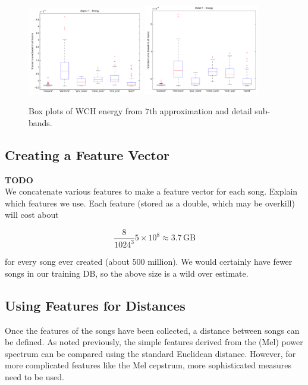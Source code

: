 \documentclass[12pt]{article}
\begin{document}
\begin{figure}[h!]
   \centering
   \includegraphics[width=0.45\textwidth]{figures/wch_box_08.pdf}
   \includegraphics[width=0.45\textwidth]{figures/wch_box_16.pdf}
   \caption{Box plots of WCH energy from $7$th approximation and detail sub-bands.}
   \label{fig:wch_box}
\end{figure}

\subsection{Creating a Feature Vector}
\textbf{TODO}\\
We concatenate various features to make a feature vector for each song.  Explain which features we use.  Each feature (stored as a double, which may be overkill) will cost about 

\[ \dfrac{8}{1024^3}5\times10^8 \approx 3.7\,\text{GB} \] 

\noindent for every song ever created (about $500$ million).  We would certainly have fewer songs in our training DB, so the above size is a wild over estimate.

\subsection{Using Features for Distances}

Once the features of the songs have been collected, a distance between songs can be defined.  As noted previously, the simple features derived from the (Mel) power spectrum can be compared using the standard Euclidean distance.  However, for more complicated features like the Mel cepstrum, more sophisticated measures need to be used.
\end{document}
